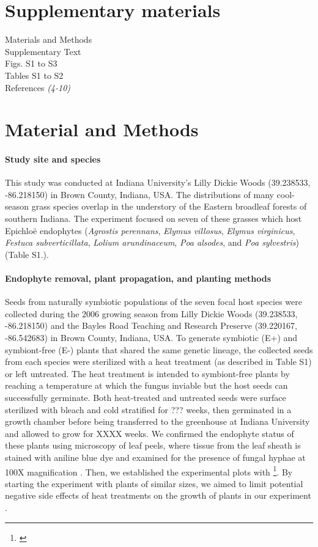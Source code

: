 \documentclass[12pt]{article}
\newcommand{\tom}[2]{{\color{red}{#1}}\footnote{\textit{\color{red}{#2}}}}
\begin{document}
\section*{Supplementary materials}
Materials and Methods\\
Supplementary Text\\


Figs. S1 to S3\\
Tables S1 to S2\\
References \textit{(4-10)}


\section*{Material and Methods}
\paragraph*{Study site and species}
This study was conducted at Indiana University's Lilly Dickie Woods (39.238533, -86.218150) in Brown County, Indiana, USA. 
The distributions of many cool-season grass species overlap in the understory of the Eastern broadleaf forests of southern Indiana. 
The experiment focused on seven of these grasses which host Epichlo\"e endophytes (\emph{Agrostis perennans}, \emph{Elymus villosus}, \emph{Elymus virginicus}, \emph{Festuca subverticillata}, \emph{Lolium arundinaceum}, \emph{Poa alsodes}, and \emph{Poa sylvestris}) (Table S1.). 

\paragraph*{Endophyte removal, plant propagation, and planting methods}
Seeds from naturally symbiotic populations of the seven focal host species were collected during the 2006 growing season from Lilly Dickie Woods (39.238533, -86.218150) and the Bayles Road Teaching and Research Preserve (39.220167, -86.542683) in Brown County, Indiana, USA. 
To generate symbiotic (E+) and symbiont-free (E-) plants that shared the same genetic lineage, the collected seeds from each species were sterilized with a heat treatment (as described in Table S1) or left untreated. 
The heat treatment is intended to symbiont-free plants by reaching a temperature at which the fungus inviable but the host seeds can successfully germinate.
Both heat-treated and untreated seeds were surface sterilized with bleach and cold stratified for {\color{red}??? weeks}, then germinated in a growth chamber before being transferred to the greenhouse at Indiana University and allowed to grow for XXXX weeks. 
We confirmed the endophyte status of these plants using microscopy of leaf peels, where tissue from the leaf sheath is stained with aniline blue dye and examined for the presence of fungal hyphae at 100X magnification \cite{bacon2018stains}. 
Then, we established the experimental plots with \tom{vegetatively propogated clones of similar sizes from the plants}{not sure this happened}. 
By starting the experiment with plants of similar sizes, we aimed to limit potential negative side effects of heat treatments on the growth of plants in our experiment \cite{rudgers2009benefits}.
\end{document}
